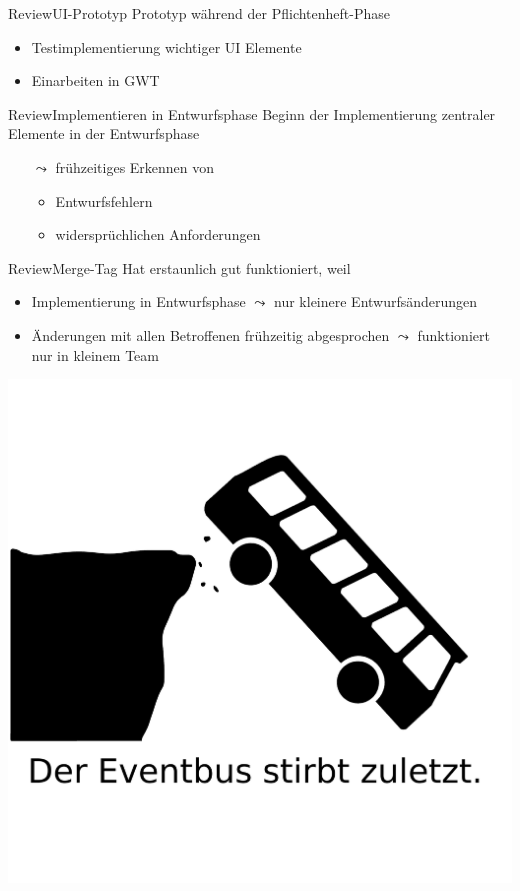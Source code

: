 \documentclass[10pt]{beamer}
\begin{document}
\begin{frame}{Review}{UI-Prototyp}
Prototyp während der Pflichtenheft-Phase
	\begin{itemize}
		\item Testimplementierung wichtiger UI Elemente
		\item Einarbeiten in GWT
	\end{itemize}
\end{frame}

\begin{frame}{Review}{Implementieren in Entwurfsphase}
Beginn der Implementierung zentraler Elemente in der Entwurfsphase 
	\begin{itemize}
		\item[$\leadsto$] frühzeitiges Erkennen von 
		\begin{itemize}
			\item Entwurfsfehlern
			\item widersprüchlichen Anforderungen
		\end{itemize}
	\end{itemize}
\end{frame}

\begin{frame}{Review}{Merge-Tag}
Hat erstaunlich gut funktioniert, weil
	\begin{itemize}
		\item Implementierung in Entwurfsphase $\leadsto$ nur kleinere Entwurfsänderungen %
		\item Änderungen mit allen Betroffenen frühzeitig abgesprochen $\leadsto$ funktioniert nur in kleinem Team
	\end{itemize}
\end{frame}

{\1
\begin{frame}
  \includegraphics[width = \textwidth]{img/eventbus}
\end{frame}}
\end{document}
